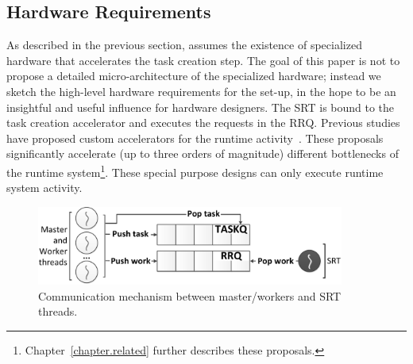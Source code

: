 \subsection{Hardware Requirements}
\label{sec:hw_req}

As described in the previous section, {\proposal} assumes the existence of specialized hardware that accelerates the task creation step. 
The goal of this paper is not to propose a detailed micro-architecture of the specialized hardware; instead we sketch the high-level hardware requirements for the {\proposal} set-up, in the hope to be an insightful and useful influence for hardware designers.
The SRT is bound to the task creation accelerator and executes the requests in the RRQ. 
Previous studies have proposed custom accelerators for the runtime activity~\cite{TaskSS, Xubin, Nexus, Swarm, TMU, Carbon}. 
These proposals significantly accelerate (up to three orders of magnitude) different bottlenecks of the runtime system\footnote{Chapter~\ref{chapter.related} further describes these proposals.}. 
These special purpose designs can only execute runtime system activity.


\begin{figure}[t!]%
	\centering
	
	\includegraphics[width=0.9\textwidth]{figures/communication2.pdf}
	\caption{Communication mechanism between master/workers and SRT threads.}
	\label{fig:communication}
\end{figure}
	
